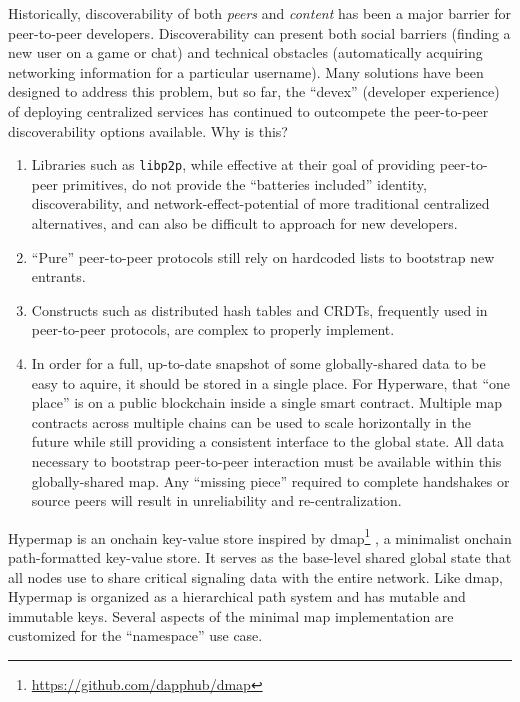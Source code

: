 \documentclass[runningheads]{llncs}
\begin{document}
Historically, discoverability of both \textit{peers} and \textit{content} has been a major barrier for peer-to-peer developers.
Discoverability can present both social barriers (finding a new user on a game or chat) and technical obstacles (automatically acquiring networking information for a particular username).
Many solutions have been designed to address this problem, but so far, the ``devex'' (developer experience) of deploying centralized services has continued to outcompete the peer-to-peer discoverability options available.
Why is this?
\begin{enumerate}
    \item Libraries such as \verb|libp2p|, while effective at their goal of providing peer-to-peer primitives, do not provide the ``batteries included'' identity, discoverability, and network-effect-potential of more traditional centralized alternatives, and can also be difficult to approach for new developers.
    \item ``Pure'' peer-to-peer protocols still rely on hardcoded lists to bootstrap new entrants.
    \item Constructs such as distributed hash tables and CRDTs, frequently used in peer-to-peer protocols, are complex to properly implement.
    \item In order for a full, up-to-date snapshot of some globally-shared data to be easy to aquire, it should be stored in a single place.
    \subitem For Hyperware, that ``one place'' is on a public blockchain inside a single smart contract.
    \subitem Multiple map contracts across multiple chains can be used to scale horizontally in the future while still providing a consistent interface to the global state.
    \subitem All data necessary to bootstrap peer-to-peer interaction must be available within this globally-shared map.
    \subitem Any ``missing piece'' required to complete handshakes or source peers will result in unreliability and re-centralization.
\end{enumerate}

Hypermap is an onchain key-value store inspired by dmap\footnote{\url{https://github.com/dapphub/dmap}}
, a minimalist onchain path-formatted key-value store.
It serves as the base-level shared global state that all nodes use to share critical signaling data with the entire network.
Like dmap, Hypermap is organized as a hierarchical path system and has mutable and immutable keys.
Several aspects of the minimal map implementation are customized for the ``namespace'' use case.
\end{document}
